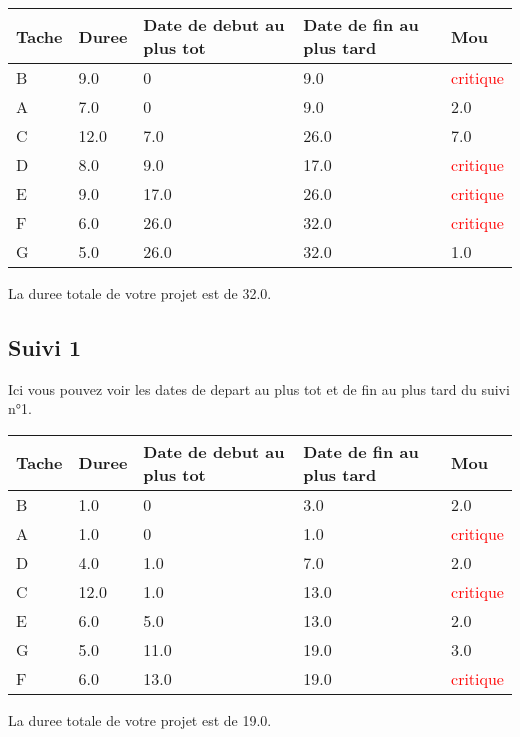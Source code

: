 \documentclass{article}
\begin{document}
\begin{tabular}{|l|l|l|l|l|}
\hline 
Tache & Duree & Date de debut au plus tot & Date de fin au plus tard & Mou\tabularnewline
\hline

B&9.0&0&9.0&\textcolor{red}{critique}\tabularnewline
\hline
A&7.0&0&9.0&2.0\tabularnewline
\hline
C&12.0&7.0&26.0&7.0\tabularnewline
\hline
D&8.0&9.0&17.0&\textcolor{red}{critique}\tabularnewline
\hline
E&9.0&17.0&26.0&\textcolor{red}{critique}\tabularnewline
\hline
F&6.0&26.0&32.0&\textcolor{red}{critique}\tabularnewline
\hline
G&5.0&26.0&32.0&1.0\tabularnewline
\hline

\end{tabular}
La duree totale de votre projet est de 32.0.

\subsection{Suivi 1}
Ici vous pouvez voir les dates de depart au plus tot et de fin au plus tard du suivi n°1.\\
\begin{tabular}{|l|l|l|l|l|}
\hline 
Tache & Duree & Date de debut au plus tot & Date de fin au plus tard & Mou\tabularnewline
\hline

B&1.0&0&3.0&2.0\tabularnewline
\hline
A&1.0&0&1.0&\textcolor{red}{critique}\tabularnewline
\hline
D&4.0&1.0&7.0&2.0\tabularnewline
\hline
C&12.0&1.0&13.0&\textcolor{red}{critique}\tabularnewline
\hline
E&6.0&5.0&13.0&2.0\tabularnewline
\hline
G&5.0&11.0&19.0&3.0\tabularnewline
\hline
F&6.0&13.0&19.0&\textcolor{red}{critique}\tabularnewline
\hline

\end{tabular}
La duree totale de votre projet est de 19.0.
\end{document}
